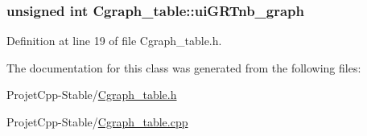 \subsubsection[{ui\+G\+R\+Tnb\+\_\+graph}]{\setlength{\rightskip}{0pt plus 5cm}unsigned int Cgraph\+\_\+table\+::ui\+G\+R\+Tnb\+\_\+graph\hspace{0.3cm}{\ttfamily [private]}}\label{class_cgraph__table_a87fbe4f547d5fa7b94697ba7b1fedc66}


Definition at line 19 of file Cgraph\+\_\+table.\+h.



The documentation for this class was generated from the following files\+:\begin{DoxyCompactItemize}
\item 
Projet\+Cpp-\/\+Stable/\hyperlink{_cgraph__table_8h}{Cgraph\+\_\+table.\+h}\item 
Projet\+Cpp-\/\+Stable/\hyperlink{_cgraph__table_8cpp}{Cgraph\+\_\+table.\+cpp}\end{DoxyCompactItemize}
